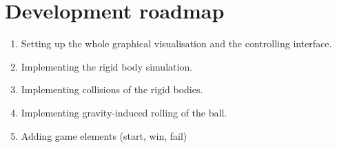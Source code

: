 \documentclass[11pt,a4paper]{article}
\begin{document}
\section{Development roadmap}
\label{sec:roadmap}
\begin{enumerate}
\item Setting up the whole graphical visualisation and the controlling interface.
\item Implementing the rigid body simulation.
\item Implementing collisions of the rigid bodies.
\item Implementing gravity-induced rolling of the ball.
\item Adding game elements (start, win, fail)
\end{enumerate}
\end{document}
